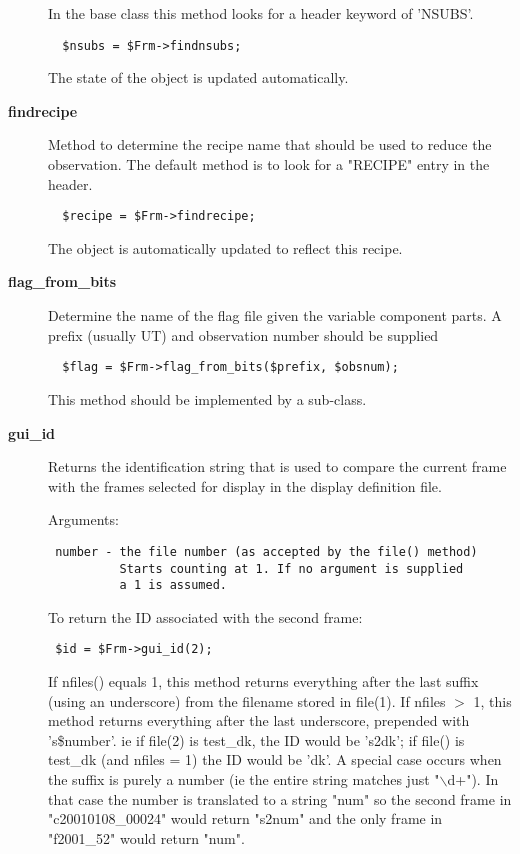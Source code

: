 \begin{description}
In the base class this method looks for a header keyword of 'NSUBS'.

\begin{verbatim}
  $nsubs = $Frm->findnsubs;
\end{verbatim}


The state of the object is updated automatically.

\item[\textbf{findrecipe}] \mbox{}

Method to determine the recipe name that should be used to reduce
the observation.
The default method is to look for a "RECIPE" entry in the header.

\begin{verbatim}
  $recipe = $Frm->findrecipe;
\end{verbatim}


The object is automatically updated to reflect this recipe.

\item[\textbf{flag\_from\_bits}] \mbox{}

Determine the name of the flag file given the variable
component parts. A prefix (usually UT) and observation number
should be supplied

\begin{verbatim}
  $flag = $Frm->flag_from_bits($prefix, $obsnum);
\end{verbatim}


This method should be implemented by a sub-class.

\item[\textbf{gui\_id}] \mbox{}

Returns the identification string that is used to compare the
current frame with the frames selected for display in the
display definition file.



Arguments:

\begin{verbatim}
 number - the file number (as accepted by the file() method)
          Starts counting at 1. If no argument is supplied
          a 1 is assumed.
\end{verbatim}


To return the ID associated with the second frame:

\begin{verbatim}
 $id = $Frm->gui_id(2);
\end{verbatim}


If nfiles() equals 1, this method returns everything after the last
suffix (using an underscore) from the filename stored in file(1). If
nfiles $>$ 1, this method returns everything after the last
underscore, prepended with 's\$number'. ie if file(2) is test\_dk, the
ID would be 's2dk'; if file() is test\_dk (and nfiles = 1) the ID would
be 'dk'. A special case occurs when the suffix is purely a number (ie
the entire string matches just "$\backslash$d+"). In that case the number is
translated to a string "num" so the second frame in "c20010108\_00024"
would return "s2num" and the only frame in "f2001\_52" would return
"num".


\end{description}
